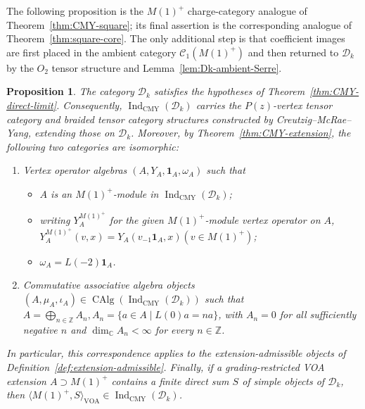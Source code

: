 \documentclass[10pt,a4paper]{amsart}
\numberwithin{equation}{section} \newtheorem{thm}{Theorem}[section] \newtheorem{lem}[thm]{Lemma} \newtheorem{ex}[thm]{Example} \newtheorem{prop}[thm]{Proposition} \newtheorem{cor}[thm]{Corollary} \newtheorem{defi}[thm]{Definition} \newtheorem{rmk}[thm]{Remark} \newtheorem{notation}[thm]{Notation}
\newcommand{\one}{\mathbf{1}}
\newcommand{\Dk}{\mathcal D_k}
\newcommand{\CAlg}{\operatorname{CAlg}}
\newcommand{\IndCMY}{\operatorname{Ind}_{\mathrm{CMY}}}
\def\Z{\mathbb{Z}} \def\N{\mathbb{N}} \def\A{\mathbb{A}} \def\C{\mathbb{C}} \def\R{\mathbb{R}} \def\Q{\mathbb{Q}} \def\F{\mathbb{F}}
\begin{document}
The following proposition is the $M(1)^+$ charge-category analogue of Theorem~\ref{thm:CMY-square}; its final assertion is the corresponding analogue of Theorem~\ref{thm:square-core}. The only additional step is that coefficient images are first placed in the ambient category $\mathcal C_1(M(1)^+)$ and then returned to $\Dk$ by the $O_2$ tensor structure and Lemma~\ref{lem:Dk-ambient-Serre}.

\begin{prop}\label{prop:CMY-O2}
The category $\Dk$ satisfies the hypotheses of Theorem~\ref{thm:CMY-direct-limit}. Consequently, $\IndCMY(\Dk)$ carries the $P(z)$-vertex tensor category and braided tensor category structures constructed by Creutzig--McRae--Yang, extending those on $\Dk$. Moreover, by Theorem~\ref{thm:CMY-extension}, the following two categories are isomorphic:
\begin{enumerate}[label=\textnormal{(\arabic*)}]
\item Vertex operator algebras $(A,Y_A,\one_A,\omega_A)$ such that
\begin{itemize}
\item $A$ is an $M(1)^+$-module in $\IndCMY(\Dk)$;
\item writing $Y_A^{M(1)^+}$ for the given $M(1)^+$-module vertex
operator on $A$, \(Y_A^{M(1)^+}(v,x)=Y_A(v_{-1}\one_A,x)(v\in M(1)^+)\);
\item $\omega_A=L(-2)\one_A$.
\end{itemize}

\item Commutative associative algebra objects
$(A,\mu_A,\iota_A)\in\CAlg(\IndCMY(\Dk))$ such that \(A=\bigoplus_{n\in\Z}A_n,A_n=\{a\in A\mid L(0)a=na\}\), with $A_n=0$ for all sufficiently negative $n$ and $\dim_\C A_n<\infty$ for every $n\in\Z$.
\end{enumerate}
In particular, this correspondence applies to the extension-admissible objects of Definition~\ref{def:extension-admissible}. Finally, if a grading-restricted VOA extension $A\supset M(1)^+$ contains a finite direct sum $S$ of simple objects of $\Dk$, then \(\langle M(1)^+,S\rangle_{\mathrm{VOA}}\in\IndCMY(\Dk)\).
\end{prop}
\end{document}
